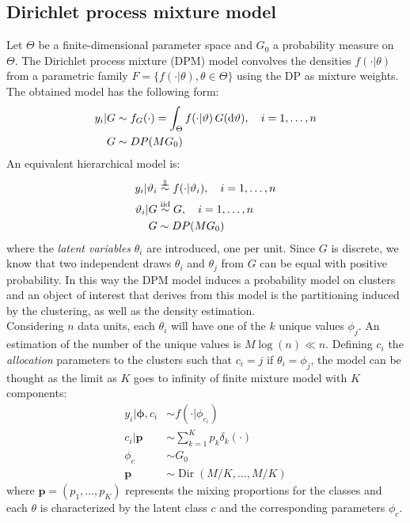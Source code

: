 \subsection{Dirichlet process mixture model}
Let $\Theta$ be a finite-dimensional parameter space and $G_0$ a probability measure on $\Theta$.
The Dirichlet process mixture (DPM) model convolves the densities $f(\cdot|\theta)$ from a parametric family $F =\{f(\cdot|\theta), \theta \in \Theta \}$ using the DP as mixture weights.
The obtained model has the following form:
\begin{equation}
	\begin{aligned}\label{dpm-1}
	y_i | G &\sim f_G(\cdot) = \int_\Theta f(\cdot|\vartheta) \, G(\mathrm d\vartheta), \quad i=1,\dots,n \\
	G &\sim DP(M G_0)
	\end{aligned}
\end{equation}
An equivalent hierarchical model is:
\begin{equation}
	\begin{aligned}\label{dpm-2}
	y_i | \theta_i &\indsim f(\cdot|\theta_i), \quad i=1,\dots,n \\
	\theta_i | G &\iidsim G, \quad i=1,\dots,n \\ 
	G &\sim DP(M G_0)
	\end{aligned}
\end{equation}
where the \emph{latent variables} $\theta_i$ are introduced, one per unit.
Since $G$ is discrete, we know that two independent draws $\theta_i$ and $\theta_j$ from $G$ can be equal with positive probability.
In this way the DPM model induces a probability model on clusters and an object of interest that derives from this model is the partitioning induced by the clustering, as well as the density estimation. \\
Considering $n$ data units, each $\theta_i$ will have one of the $k$ unique values $\phi_{j}$. An estimation of the number of the unique values is $M\log(n) \ll n$. Defining  $c_i$ the \emph{allocation} parameters to the clusters such that $c_i = j$ if $\theta_i = \phi_j$, the model can be thought as the limit as $K$ goes to infinity of
finite mixture model with $K$ components:
\begin{equation}
	\begin{aligned}\label{dpm-disc}
		y_{i}|\mathbf{\phi},c_{i} &\sim f(\cdot|\phi_{c_{i}}) \\
		c_{i}|\mathit{\mathbf{p}}&\sim \sum_{k=1}^K\mathit{p_k} \delta_k(\cdot) \\
		\phi_{c} & \sim G_{0} \\
		\mathbf{p} &\sim \operatorname{Dir}(M/K,\dots,M/K)
	\end{aligned}
\end{equation}
where $\mathbf{p}=(p_1,\dots,p_K)$ represents the mixing proportions for the classes and each $\theta$ is characterized by the latent class $c$ and the corresponding parameters $\phi_c$.

